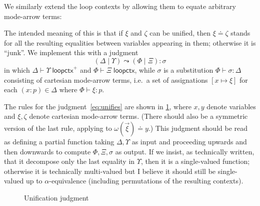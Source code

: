 \documentclass{article}
\theoremstyle{definition}
\theoremstyle{remark}
\def\ec{\diamond}
\def\loopctx{\;\mathsf{loopctx}}
\def\extloopctx{\;\mathsf{loopctx}^+}
\let\types\vdash
\def\unifies#1#2#3#4#5{(#1\mid #2) \leadsto (#3\mid#4) : #5}
\begin{document}
We similarly extend the loop contexts by allowing them to equate arbitrary mode-arrow terms:
The intended meaning of this is that if $\xi$ and $\zeta$ can be unified, then $\xi\doteq\zeta$ stands for all the resulting equalities between variables appearing in them; otherwise it is ``junk''.
We implement this with a judgment
\begin{equation}
  \unifies\Delta\Upsilon\Phi\Xi\sigma\label{eq:unifies}
\end{equation}
in which $\Delta\types \Upsilon\extloopctx$ and $\Phi\types \Xi\loopctx$, while $\sigma$ is a substitution $\Phi \types \sigma:\Delta$ consisting of cartesian mode-arrow terms, i.e.\ a set of assignations $[x \mapsto \xi]$ for each $(x:p)\in \Delta$ where $\Phi\types \xi:p$.

The rules for the judgment~\eqref{eq:unifies} are shown in \cref{fig:unifies}, where $x,y$ denote variables and $\xi,\zeta$ denote cartesian mode-arrow terms.
(There should also be a symmetric version of the last rule, applying to $\omega(\vec\xi)\doteq y$.)
This judgment should be read as defining a partial function taking $\Delta,\Upsilon$ as input and proceeding upwards and then downwards to compute $\Phi,\Xi,\sigma$ as output.
If we insist, as technically written, that it decompose only the last equality in $\Upsilon$, then it is a single-valued function; otherwise it is technically multi-valued but I believe it should still be single-valued up to $\alpha$-equivalence (including permutations of the resulting contexts).

\begin{figure}\centering
{}
\caption{Unification judgment}
\label{fig:unifies}
\end{figure}
\end{document}
